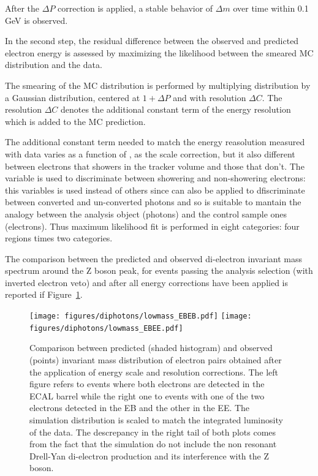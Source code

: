 After the $\Delta P$ correction is applied, a stable behavior of $\Delta m$ over time within
0.1 GeV is observed.

In the second step, the residual difference between the observed and predicted electron
energy is assessed by maximizing the likelihood between the smeared MC distribution and the data.

The smearing of the MC distribution is performed by multiplying \scE distribution by a
Gaussian distribution, centered at $1 + \Delta P$ and with resolution $\Delta C$.
The resolution $\Delta C$ denotes the additional constant term of the energy resolution which
is added to the MC prediction.

The additional constant term needed to match the energy reasolution measured with data varies as a function
of \scEta, as the scale correction, but it also different between electrons that showers in the tracker volume
and those that don't.
The \rnine variable is used to discriminate between showering and non-showering electrons: this variables is used
instead of others since can also be applied to dfiscriminate between converted and un-converted photons and
so is suitable to mantain the analogy between the analysis object (photons) and the control sample ones (electrons).
Thus maximum likelihood fit is performed in eight categories: four \scEta regions times two \rnine categories.

The comparison between the predicted and observed di-electron invariant mass spectrum around the Z boson peak,
for events passing the analysis selection (with inverted electron veto) and after all energy corrections have been applied
is reported if Figure~\ref{z_peaks}.

\begin{figure}[!h]
  \centering
  \texttt{[image: figures/diphotons/lowmass\_EBEB.pdf]}
  \texttt{[image: figures/diphotons/lowmass\_EBEE.pdf]}
  \caption{Comparison between predicted (shaded histogram) and observed (points) invariant mass distribution
    of electron pairs obtained after the application of energy scale and resolution corrections.
    The left figure refers to events where both electrons are detected in the ECAL barrel while the right one
    to events with one of the two electrons detected in the EB and the other in the EE.
    The simulation distribution is scaled to match the integrated luminosity of the data.
    The descrepancy in the right tail of both plots comes from the fact that the simulation do not include
  the non resonant Drell-Yan di-electron production and its interference with the Z boson.}
  \label{z_peaks}
\end{figure}  

